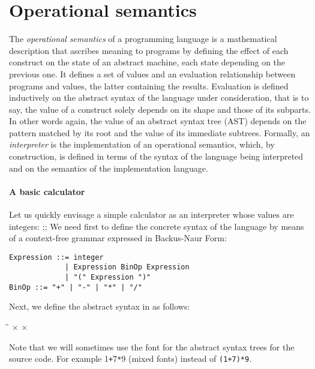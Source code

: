 \section{Operational semantics}

The \emph{operational semantics} of a programming language is a
mathematical description that ascribes meaning to programs by defining
the effect of each construct on the state of an abstract machine, each
state depending on the previous one. It defines a set of values and an
evaluation relationship between programs and values, the latter
containing the results. Evaluation is defined inductively on the
abstract syntax of the language under consideration, that is to say,
the value of a construct solely depends on its shape and those of its
subparts. In other words again, the value of an abstract syntax tree
(AST) depends on the pattern matched by its root and the value of its
immediate subtrees. Formally, an \emph{interpreter} is the
implementation of an operational semantics, which, by construction, is
defined in terms of the syntax of the language being interpreted and
on the semantics of the implementation language.

\paragraph{A basic calculator}

Let us quickly envisage a simple calculator as an \OCaml interpreter
whose values are integers: \Xtype {} \equal
{}\textsf{;;} We need first to define the concrete syntax of
the language by means of a context-free grammar expressed in
Backus-Naur Form:
\begin{verbatim}
Expression ::= integer
             | Expression BinOp Expression
             | "(" Expression ")"
BinOp ::= "+" | "-" | "*" | "/"
\end{verbatim}
Next, we define the abstract syntax in \OCaml as follows:
\begin{tabbing}
\Xtype {} \= \equal \=  \Xof
{} \vbar {} \Xof {} \(\times\)
 \(\times\) \\
\Xand {} \equal {} \vbar {}
\vbar {} \vbar {}
\end{tabbing}
Note that we will sometimes use the font for the abstract syntax trees
for the source code. For example
\lpar\num{1}\texttt{+}\num{7}\rpar\texttt{*}\num{9} (mixed fonts)
instead of \texttt{(1+7)*9}.

